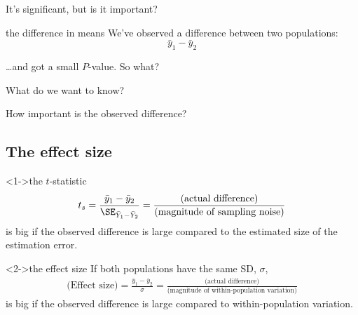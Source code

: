 \begin{frame}{It's significant, but is it important?}


    \begin{block}{the difference in means}
        We've observed a difference between two populations:
        \[  \bar y_1 - \bar y_2 \]
    \end{block}

    \ldots and got a small $P$-value.  So what?

    \vspace{2em}

     What do we want to know?\\

    \vspace{2em}

    How important is the observed difference?


\end{frame}


\subsection{The effect size}

\begin{frame}{}

    \begin{block}<1->{the $t$-statistic}
        \begin{align*}
            t_s = \frac{\bar y_1 - \bar y_2}{ \SE_{\bar Y_1 - \bar Y_2} } 
            = \frac{ \text{(actual difference)} }{ \text{(magnitude of sampling noise)} }
        \end{align*}
        is big if the observed difference is large compared to the estimated size of the \alert{estimation error}.
    \end{block}

    \begin{block}<2->{the effect size}
        If both populations have the same SD, $\sigma$,
        \begin{align*}
            \text{(Effect size)} = \frac{\bar y_1 - \bar y_2}{ \sigma }
            = \frac{ \text{(actual difference)} }{ \text{(magnitude of within-population variation)} }
        \end{align*}
        is big if the observed difference is large compared to \alert{within-population variation}.
    \end{block}

\end{frame}

